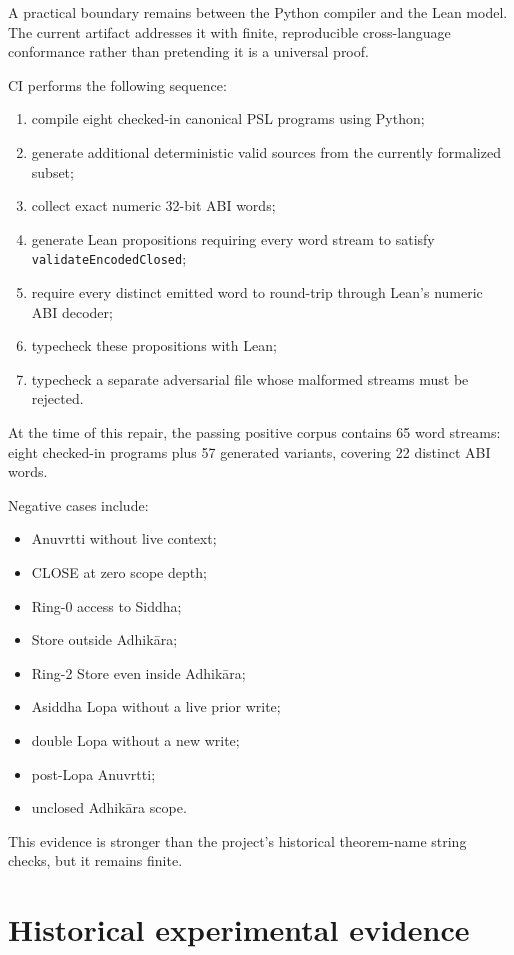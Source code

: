 \documentclass[11pt,a4paper]{article}
\begin{document}
A practical boundary remains between the Python compiler and the Lean model.
The current artifact addresses it with finite, reproducible cross-language
conformance rather than pretending it is a universal proof.

CI performs the following sequence:

\begin{enumerate}
\item compile eight checked-in canonical PSL programs using Python;
\item generate additional deterministic valid sources from the currently
      formalized subset;
\item collect exact numeric 32-bit ABI words;
\item generate Lean propositions requiring every word stream to satisfy
      \texttt{validateEncodedClosed};
\item require every distinct emitted word to round-trip through Lean's
      numeric ABI decoder;
\item typecheck these propositions with Lean;
\item typecheck a separate adversarial file whose malformed streams must be
      rejected.
\end{enumerate}

At the time of this repair, the passing positive corpus contains 65 word
streams: eight checked-in programs plus 57 generated variants, covering 22
distinct ABI words.

Negative cases include:

\begin{itemize}
\item Anuvrtti without live context;
\item CLOSE at zero scope depth;
\item Ring-0 access to Siddha;
\item Store outside Adhik\={a}ra;
\item Ring-2 Store even inside Adhik\={a}ra;
\item Asiddha Lopa without a live prior write;
\item double Lopa without a new write;
\item post-Lopa Anuvrtti;
\item unclosed Adhik\={a}ra scope.
\end{itemize}

This evidence is stronger than the project's historical theorem-name string
checks, but it remains finite.

\section{Historical experimental evidence}
\end{document}
